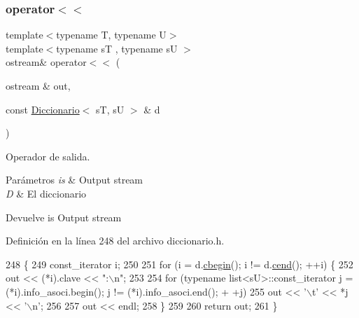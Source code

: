 \subsubsection{\texorpdfstring{operator$<$$<$}{operator<<}}
{\footnotesize\ttfamily template$<$typename T, typename U$>$ \\
template$<$typename sT , typename sU $>$ \\
ostream\& operator$<$$<$ (\begin{DoxyParamCaption}\item[{ostream \&}]{out,  }\item[{const \hyperlink{classDiccionario}{Diccionario}$<$ sT, sU $>$ \&}]{d }\end{DoxyParamCaption})\hspace{0.3cm}{\ttfamily [friend]}}



Operador de salida. 


\begin{DoxyParams}{Parámetros}
{\em is} & Output stream \\
\hline
{\em D} & El diccionario \\
\hline
\end{DoxyParams}
\begin{DoxyReturn}{Devuelve}
is Output stream 
\end{DoxyReturn}


Definición en la línea 248 del archivo diccionario.\+h.


\begin{DoxyCode}
248                                                                            \{
249         const\_iterator i; 
250         
251         \textcolor{keywordflow}{for} (i = d.\hyperlink{classDiccionario_a8d18a8044a6c1a1482762fd84ab37017}{cbegin}(); i != d.\hyperlink{classDiccionario_ac4e5b5c7800bf3df103ca6b58f118598}{cend}(); ++i) \{
252           out << (*i).clave << \textcolor{stringliteral}{":\(\backslash\)n"};
253 
254           \textcolor{keywordflow}{for} (\textcolor{keyword}{typename} list<sU>::const\_iterator j = (*i).info\_asoci.begin(); j != (*i).info\_asoci.end(); +
      +j)
255             out << \textcolor{charliteral}{'\(\backslash\)t'} << *j << \textcolor{charliteral}{'\(\backslash\)n'};
256 
257           out << endl;
258         \}
259 
260         \textcolor{keywordflow}{return} out;
261     \}
\end{DoxyCode}
\mbox{\label{classDiccionario_a2313add83e8a854c86c6cff6aee5b019}} 
